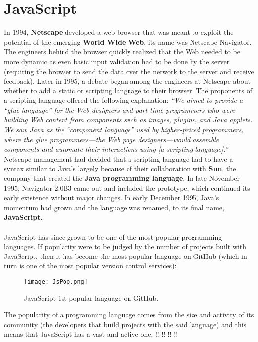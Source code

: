 \documentclass{l4proj}
\begin{document}
\section{JavaScript}
\hspace*{3em} In 1994, \textbf{Netscape} developed a web browser that was meant to exploit the potential of the emerging \textbf{World Wide Web}, its name was Netscape Navigator. The engineers behind the browser quickly realized that the Web needed to be more dynamic as even basic input validation had to be done by the server (requiring the browser to send the data over the network to the server and receive feedback). Later in 1995, a debate began among the engineers at Netscape about whether to add a static or scripting language to their browser. The proponents of a scripting language offered the following explanation:\cite{jsgrandpa} 
\textit{``We aimed to provide a “glue language” for the Web designers and part time programmers who were building Web content from components such as images, plugins, and Java applets. We saw Java as the “component language” used by higher-priced programmers, where the glue programmers—the Web page designers—would assemble components and automate their interactions using [a scripting language].''}
Netscape management had decided that a scripting language had to have a syntax similar to Java’s largely because of their collaboration with \textbf{Sun}, the company that created the \textbf{Java programming language}. In late November 1995, Navigator 2.0B3 came out and included the prototype, which continued its early existence without major changes. In early December 1995, Java’s momentum had grown and the language was renamed, to its final name, \textbf{JavaScript}.\cite{jsdaddy}
\\\\
\hspace*{3em} JavaScript has since grown to be one of the most popular programming languages. If popularity were to be judged by the number of projects built with JavaScript, then it has become the most popular language on GitHub\cite{github} (which in turn is one of the most popular version control services):

\begin{figure}[!ht]
  \centering
    \texttt{[image: JsPop.png]}
    \caption{JavaScript 1st popular language on GitHub.\cite{githut}}
\end{figure}
The popularity of a programming language comes from the size and activity of its community (the developers that build projects with the said language) and this means that JavaScript has a vast and active one. !!-!!-!!-!!
\end{document}
